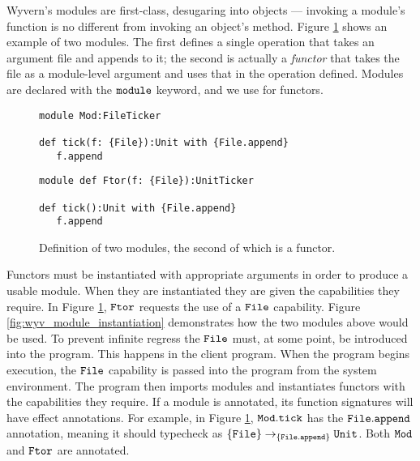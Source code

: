 Wyvern's modules are first-class, desugaring into objects --- invoking a module's function is no different from invoking an object's method.
Figure \ref{fig:wyv_modules} shows an example of two modules.
The first defines a single operation  that takes an argument file and appends to it; the second is actually a \textit{functor} that takes the file as a module-level argument and uses that in the operation defined.
Modules are declared with the $\mathtt{module}$ keyword, and we use   for functors.

\begin{figure}[h]

\begin{lstlisting}
module Mod:FileTicker

def tick(f: {File}):Unit with {File.append}
   f.append

\end{lstlisting}

\begin{lstlisting}
module def Ftor(f: {File}):UnitTicker

def tick():Unit with {File.append}
   f.append
\end{lstlisting}

\caption{Definition of two modules, the second of which is a functor.}
\label{fig:wyv_modules}
\end{figure}

Functors must be instantiated with appropriate arguments in order to produce a usable module.
When they are instantiated they are given the capabilities they require.
In Figure \ref{fig:wyv_modules}, $\mathtt{Ftor}$ requests the use of a $\mathtt{File}$ capability.
Figure \ref{fig:wyv_module_instantiation} demonstrates how the two modules above would be used. To prevent infinite regress the $\mathtt{File}$ must, at some point, be introduced into the program. This happens in the client program. When the program begins execution, the $\mathtt{File}$ capability is passed into the program from the system environment. The program then imports modules and instantiates functors with the capabilities they require. If a module is annotated, its function signatures will have effect annotations. For example, in Figure \ref{fig:wyv_modules}, $\mathtt{Mod.tick}$ has the $\mathtt{File.append}$ annotation, meaning it should typecheck as $\mathtt{ \{ File \} \rightarrow_{\{\mathtt{File.append}\}} \mathtt{Unit} }$. Both $\mathtt{Mod}$ and $\mathtt{Ftor}$ are annotated. 


